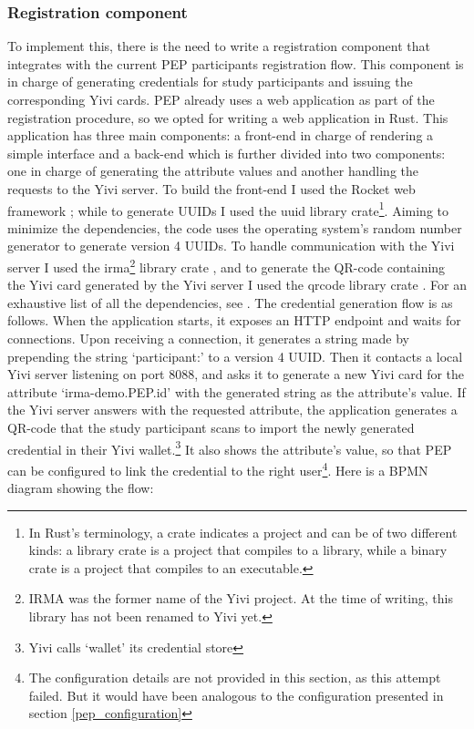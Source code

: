 \documentclass{report}
\begin{document}
\subsubsection{Registration component}\label{registration-component}
To implement this, there is the need to write a registration component that integrates with the current PEP participants registration flow. This component is in charge of
generating credentials for study participants and issuing the corresponding Yivi cards. PEP already uses a web application as part of the registration procedure, so we opted for
writing a web application in Rust. This application has three main components: a front-end in charge of rendering a simple interface and a back-end which is further divided into
two components: one in charge of generating the attribute values and another handling the requests to the Yivi server. To build the front-end I used the Rocket web framework
\cite{rocket}; while to generate UUIDs I used the uuid \cite{uuid_crate} library crate\footnote{In Rust's terminology, a crate indicates a project and can be of two different kinds:
a library crate is a project that compiles to a library, while a binary crate is a project that compiles to an executable.}. Aiming to minimize the dependencies, the code uses the
operating system's random number generator to generate version 4 UUIDs. To handle communication with the Yivi server I used the irma\footnote{IRMA was the former name of the Yivi
project. At the time of writing, this library has not been renamed to Yivi yet.} library crate \cite{irma_crate}, and to generate the QR-code containing the Yivi card generated by
the Yivi server I used the qrcode library crate \cite{qrcode_crate}. For an exhaustive list of all the dependencies, see \cite{registration_poc_cargo_toml}. The credential
generation flow is as follows. When the application starts, it exposes an HTTP endpoint and waits for connections. Upon receiving a connection, it generates a string made by
prepending the string \enquote*{participant:} to a version 4 UUID. Then it contacts a local Yivi server listening on port 8088, and asks it to generate a new Yivi card for the
attribute \enquote*{irma-demo.PEP.id} with the generated string as the attribute's value. If the Yivi server answers with the requested attribute, the application generates a
QR-code that the study participant scans to import the newly generated credential in their Yivi wallet.\footnote{Yivi calls \enquote*{wallet} its credential store} It also shows the attribute's value, so that PEP can
be configured to link the credential to the right user\footnote{The configuration details are not provided in this section, as this attempt failed. But it would have been analogous
to the configuration presented in section \ref{pep_configuration}}. Here is a BPMN diagram showing the flow:
\end{document}
